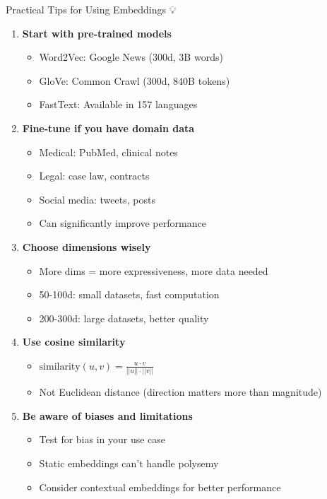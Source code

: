 \documentclass[aspectratio=169]{beamer}
\begin{document}
\begin{frame}[shrink=10]{Practical Tips for Using Embeddings 💡}
\begin{enumerate}\setlength{\itemsep}{0pt}
    \item \textbf{Start with pre-trained models}
    \begin{itemize}\setlength{\itemsep}{0pt}
        \item Word2Vec: Google News (300d, 3B words)
        \item GloVe: Common Crawl (300d, 840B tokens)
        \item FastText: Available in 157 languages
    \end{itemize}

    \item \textbf{Fine-tune if you have domain data}
    \begin{itemize}\setlength{\itemsep}{0pt}
        \item Medical: PubMed, clinical notes
        \item Legal: case law, contracts
        \item Social media: tweets, posts
        \item Can significantly improve performance
    \end{itemize}

    \item \textbf{Choose dimensions wisely}
    \begin{itemize}\setlength{\itemsep}{0pt}
        \item More dims = more expressiveness, more data needed
        \item 50-100d: small datasets, fast computation
        \item 200-300d: large datasets, better quality
    \end{itemize}

    \item \textbf{Use cosine similarity}
    \begin{itemize}\setlength{\itemsep}{0pt}
        \item $\text{similarity}(u,v) = \frac{u \cdot v}{||u|| \cdot ||v||}$
        \item Not Euclidean distance (direction matters more than magnitude)
    \end{itemize}

    \item \textbf{Be aware of biases and limitations}
    \begin{itemize}\setlength{\itemsep}{0pt}
        \item Test for bias in your use case
        \item Static embeddings can't handle polysemy
        \item Consider contextual embeddings for better performance
    \end{itemize}
\end{enumerate}
\end{frame}
\end{document}
